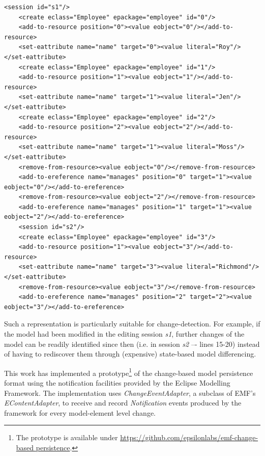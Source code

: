 \documentclass[12pt, a4paper]{report} \usepackage[titletoc]{appendix}
\begin{document}
	\begin{lstlisting}[style=xml,caption={Change-based representation of the model of Figure \ref{fig:modified_chart}.},label=lst:change-based persistencemodel_0]
	<session id="s1"/>
	<create eclass="Employee" epackage="employee" id="0"/>
	<add-to-resource position="0"><value eobject="0"/></add-to-resource>
	<set-eattribute name="name" target="0"><value literal="Roy"/></set-eattribute>
	<create eclass="Employee" epackage="employee" id="1"/>
	<add-to-resource position="1"><value eobject="1"/></add-to-resource>
	<set-eattribute name="name" target="1"><value literal="Jen"/></set-eattribute>
	<create eclass="Employee" epackage="employee" id="2"/>
	<add-to-resource position="2"><value eobject="2"/></add-to-resource>
	<set-eattribute name="name" target="1"><value literal="Moss"/></set-eattribute>
	<remove-from-resource><value eobject="0"/></remove-from-resource>
	<add-to-ereference name="manages" position="0" target="1"><value eobject="0"/></add-to-ereference>
	<remove-from-resource><value eobject="2"/></remove-from-resource>
	<add-to-ereference name="manages" position="1" target="1"><value eobject="2"/></add-to-ereference>
	<session id="s2"/>
	<create eclass="Employee" epackage="employee" id="3"/>
	<add-to-resource position="1"><value eobject="3"/></add-to-resource>
	<set-eattribute name="name" target="3"><value literal="Richmond"/></set-eattribute>
	<remove-from-resource><value eobject="3"/></remove-from-resource>
	<add-to-ereference name="manages" position="2" target="2"><value eobject="3"/></add-to-ereference>
	\end{lstlisting}
    
Such a representation is particularly suitable for change-detection. For example, if the model had been modified in the editing session \emph{s1}, further changes of the model can be readily identified since then (i.e. in session \emph{s2} –- lines 15-20) instead of having to rediscover them through (expensive) state-based model differencing.

This work has implemented a prototype\footnote{The prototype is available under \url{https://github.com/epsilonlabs/emf-change-based persistence}.} of the change-based model persistence format using the notification facilities provided by the Eclipse Modelling Framework. The implementation uses \emph{ChangeEventAdapter}, a subclass of EMF's \emph{EContentAdapter}, to receive and record \emph{Notification} events produced by the framework for every model-element level change.
\end{document}
